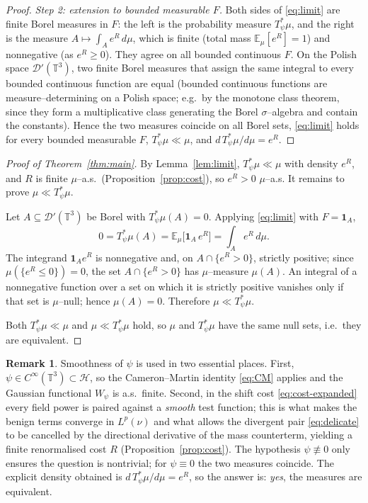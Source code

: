 \documentclass[12pt]{article}
\theoremstyle{definition}
\newtheorem{remark}{Remark}
\newcommand{\T}{\mathbb{T}^3}
\newcommand{\E}{\mathbb{E}}
\newcommand{\D}{\mathcal{D}'(\T)}
\begin{document}
\begin{proof}
\emph{Step 2: extension to bounded measurable $F$.}
Both sides of \eqref{eq:limit} are finite Borel measures in $F$: the left is the
probability measure $T_\psi^{*}\mu$, and the right is the measure
$A\mapsto\int_A e^{R}\,d\mu$, which is finite (total mass $\E_\mu[e^R]=1$) and nonnegative
(as $e^R\ge0$). They agree on all bounded continuous $F$. On the Polish space $\D$, two
finite Borel measures that assign the same integral to every bounded continuous function
are equal (bounded continuous functions are measure--determining on a Polish space; e.g.\
by the monotone class theorem, since they form a multiplicative class generating the Borel
$\sigma$--algebra and contain the constants). Hence the two measures coincide on all Borel
sets, \eqref{eq:limit} holds for every bounded measurable $F$, $T_\psi^{*}\mu\ll\mu$, and
$d\,T_\psi^{*}\mu/d\mu=e^{R}$.
\end{proof}

\begin{proof}[Proof of Theorem~\ref{thm:main}]
By Lemma~\ref{lem:limit}, $T_\psi^{*}\mu\ll\mu$ with density $e^{R}$, and $R$ is finite
$\mu$--a.s.\ (Proposition~\ref{prop:cost}), so $e^{R}>0$ $\mu$--a.s. It remains to prove
$\mu\ll T_\psi^{*}\mu$.

Let $A\subseteq\D$ be Borel with $T_\psi^{*}\mu(A)=0$. Applying \eqref{eq:limit} with
$F=\mathbf 1_A$,
\[
  0=T_\psi^{*}\mu(A)=\E_\mu\!\big[\mathbf 1_A\,e^{R}\big]=\int_A e^{R}\,d\mu .
\]
The integrand $\mathbf 1_A e^{R}$ is nonnegative and, on $A\cap\{e^R>0\}$, strictly
positive; since $\mu(\{e^R\le0\})=0$, the set $A\cap\{e^R>0\}$ has $\mu$--measure
$\mu(A)$. An integral of a nonnegative function over a set on which it is strictly
positive vanishes only if that set is $\mu$--null; hence $\mu(A)=0$. Therefore
$\mu\ll T_\psi^{*}\mu$.

Both $T_\psi^{*}\mu\ll\mu$ and $\mu\ll T_\psi^{*}\mu$ hold, so $\mu$ and $T_\psi^{*}\mu$
have the same null sets, i.e.\ they are equivalent.
\end{proof}

\begin{remark}
Smoothness of $\psi$ is used in two essential places. First, $\psi\in C^\infty(\T)\subset\mathcal H$,
so the Cameron--Martin identity \eqref{eq:CM} applies and the Gaussian functional $W_\psi$
is a.s.\ finite. Second, in the shift cost \eqref{eq:cost-expanded} every field power is
paired against a \emph{smooth} test function; this is what makes the benign terms converge
in $L^p(\nu)$ and what allows the divergent pair \eqref{eq:delicate} to be cancelled by the
directional derivative of the mass counterterm, yielding a finite renormalised cost $R$
(Proposition~\ref{prop:cost}). The hypothesis $\psi\not\equiv0$ only ensures the question
is nontrivial; for $\psi\equiv0$ the two measures coincide. The explicit density obtained
is $d\,T_\psi^{*}\mu/d\mu=e^{R}$, so the answer is: \emph{yes}, the measures are
equivalent.
\end{remark}
\end{document}
